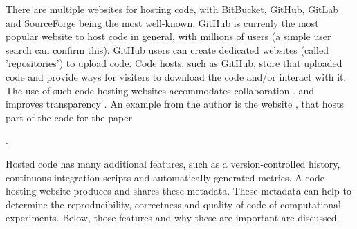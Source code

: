 
There are multiple websites for hosting code, with BitBucket, GitHub,
GitLab and SourceForge being the most well-known.
GitHub is currenly the most popular website to host code in general,
with millions of users (a simple user search can confirm this).
GitHub users can create dedicated websites (called 'repositories')
to upload code. Code hosts, such as GitHub, 
store that uploaded code and provide ways 
for visiters to download the code and/or interact with it.
The use of such code hosting websites
accommodates collaboration \cite{perez2016ten}.
and improves transparency \cite{gorgolewski2016practical}.
An example from the author is the website \cite{bbbqarticleissue157},
that hosts part of the code for the paper \cite{bilderbeek2022transmembrane}

.

Hosted code has many additional features, such as
a version-controlled history, continuous integration scripts
and automatically generated metrics.
A code hosting website produces and shares these metadata.
These metadata can help to determine the
reproducibility, correctness and quality of code
of computational experiments.
Below, those features and why these are important are discussed.

